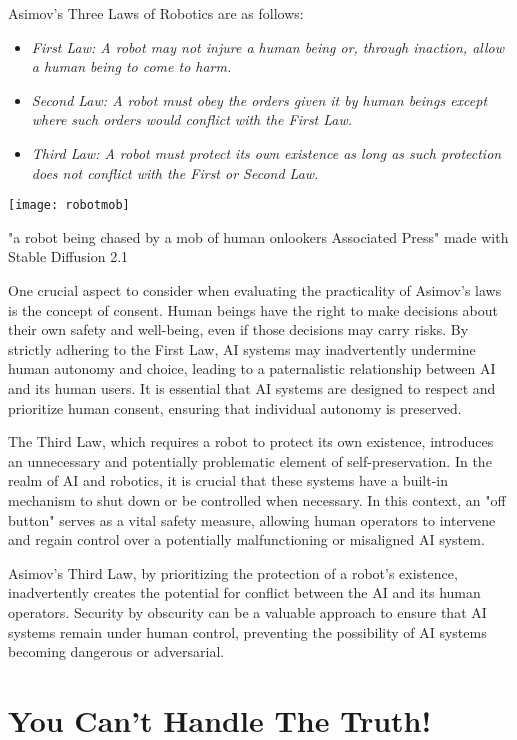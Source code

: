 Asimov's Three Laws of Robotics are as follows:

\begin{itemize}
\item\textit{First Law: A robot may not injure a human being or, through inaction, allow a human being to come to harm.}
\item\textit{Second Law: A robot must obey the orders given it by human beings except where such orders would conflict with the First Law.}
\item\textit{Third Law: A robot must protect its own existence as long as such protection does not conflict with the First or Second Law.}
\end{itemize}

\begin{marginfigure}[-5.5cm]
        \texttt{[image: robotmob]}
        \caption{"a robot being chased by a mob of human onlookers Associated Press" made with Stable Diffusion 2.1}
\end{marginfigure}

One crucial aspect to consider when evaluating the practicality of Asimov's laws is the concept of consent. Human beings have the right to make decisions about their own safety and well-being, even if those decisions may carry risks. By strictly adhering to the First Law, AI systems may inadvertently undermine human autonomy and choice, leading to a paternalistic relationship between AI and its human users. It is essential that AI systems are designed to respect and prioritize human consent, ensuring that individual autonomy is preserved.

The Third Law, which requires a robot to protect its own existence, introduces an unnecessary and potentially problematic element of self-preservation. In the realm of AI and robotics, it is crucial that these systems have a built-in mechanism to shut down or be controlled when necessary. In this context, an "off button" serves as a vital safety measure, allowing human operators to intervene and regain control over a potentially malfunctioning or misaligned AI system.

Asimov's Third Law, by prioritizing the protection of a robot's existence, inadvertently creates the potential for conflict between the AI and its human operators. Security by obscurity can be a valuable approach to ensure that AI systems remain under human control, preventing the possibility of AI systems becoming dangerous or adversarial.

\section{You Can't Handle The Truth!}

